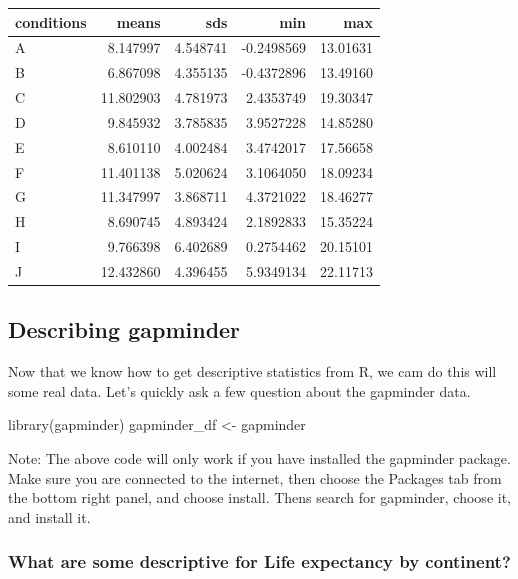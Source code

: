 \documentclass[
]{book}
\newenvironment{Shaded}{\begin{snugshade}}{\end{snugshade}}
\newcommand{\FunctionTok}[1]{\textcolor[rgb]{0.00,0.00,0.00}{#1}}
\newcommand{\NormalTok}[1]{#1}
\newcommand{\OtherTok}[1]{\textcolor[rgb]{0.56,0.35,0.01}{#1}}
\begin{document}
\begin{tabular}{l|r|r|r|r}
\hline
conditions & means & sds & min & max\\
\hline
A & 8.147997 & 4.548741 & -0.2498569 & 13.01631\\
\hline
B & 6.867098 & 4.355135 & -0.4372896 & 13.49160\\
\hline
C & 11.802903 & 4.781973 & 2.4353749 & 19.30347\\
\hline
D & 9.845932 & 3.785835 & 3.9527228 & 14.85280\\
\hline
E & 8.610110 & 4.002484 & 3.4742017 & 17.56658\\
\hline
F & 11.401138 & 5.020624 & 3.1064050 & 18.09234\\
\hline
G & 11.347997 & 3.868711 & 4.3721022 & 18.46277\\
\hline
H & 8.690745 & 4.893424 & 2.1892833 & 15.35224\\
\hline
I & 9.766398 & 6.402689 & 0.2754462 & 20.15101\\
\hline
J & 12.432860 & 4.396455 & 5.9349134 & 22.11713\\
\hline
\end{tabular}

\hypertarget{describing-gapminder}{%
\subsection{Describing gapminder}\label{describing-gapminder}}

Now that we know how to get descriptive statistics from R, we cam do this will some real data. Let's quickly ask a few question about the gapminder data.

\begin{Shaded}
\begin{Highlighting}[]
\FunctionTok{library}\NormalTok{(gapminder)}
\NormalTok{gapminder\_df }\OtherTok{\textless{}{-}}\NormalTok{ gapminder}
\end{Highlighting}
\end{Shaded}

Note: The above code will only work if you have installed the gapminder package. Make sure you are connected to the internet, then choose the Packages tab from the bottom right panel, and choose install. Thens search for gapminder, choose it, and install it.

\hypertarget{what-are-some-descriptive-for-life-expectancy-by-continent}{%
\subsubsection{What are some descriptive for Life expectancy by continent?}\label{what-are-some-descriptive-for-life-expectancy-by-continent}}
\end{document}
